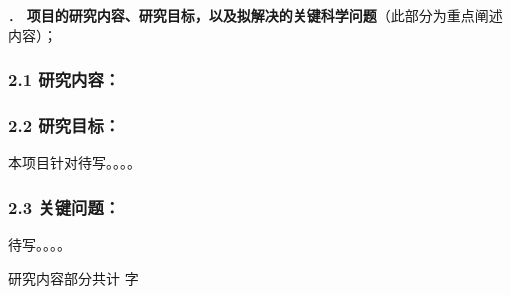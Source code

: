 {\sihao \color{MsBlue} ． {\bfseries 项目的研究内容、研究目标，以及拟解决的关键科学问题}（此部分为重点阐述内容）；}

\subsubsection{\bfseries 2.1 研究内容：}





\subsubsection{\bfseries 2.2 研究目标：}

本项目针对待写。。。。


\subsubsection{\bfseries 2.3 关键问题：}

待写。。。。


\ifhandout
\else
\begin{center}
{\larger[2]\color{red}  研究内容部分共计 \wordcount 字 }
\end{center}
\fi


\vskip 5mm
